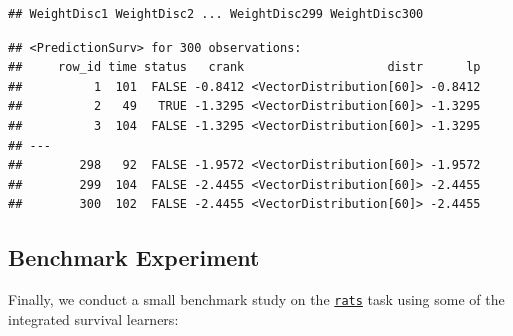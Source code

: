 \documentclass[]{scrbook}
\newenvironment{Shaded}{\begin{snugshade}}{\end{snugshade}}
\newcommand{\CommentTok}[1]{\textcolor[rgb]{0.56,0.35,0.01}{\textit{#1}}}
\newcommand{\DataTypeTok}[1]{\textcolor[rgb]{0.13,0.29,0.53}{#1}}
\newcommand{\DecValTok}[1]{\textcolor[rgb]{0.00,0.00,0.81}{#1}}
\newcommand{\KeywordTok}[1]{\textcolor[rgb]{0.13,0.29,0.53}{\textbf{#1}}}
\newcommand{\NormalTok}[1]{#1}
\newcommand{\OperatorTok}[1]{\textcolor[rgb]{0.81,0.36,0.00}{\textbf{#1}}}
\newcommand{\OtherTok}[1]{\textcolor[rgb]{0.56,0.35,0.01}{#1}}
\newcommand{\StringTok}[1]{\textcolor[rgb]{0.31,0.60,0.02}{#1}}
\renewenvironment{Shaded} {\begin{snugshade}\small} {\end{snugshade}}
\begin{document}
\begin{verbatim}
## WeightDisc1 WeightDisc2 ... WeightDisc299 WeightDisc300
\end{verbatim}

\begin{Shaded}
\end{Shaded}

\begin{verbatim}
## <PredictionSurv> for 300 observations:
##     row_id time status   crank                    distr      lp
##          1  101  FALSE -0.8412 <VectorDistribution[60]> -0.8412
##          2   49   TRUE -1.3295 <VectorDistribution[60]> -1.3295
##          3  104  FALSE -1.3295 <VectorDistribution[60]> -1.3295
## ---                                                            
##        298   92  FALSE -1.9572 <VectorDistribution[60]> -1.9572
##        299  104  FALSE -2.4455 <VectorDistribution[60]> -2.4455
##        300  102  FALSE -2.4455 <VectorDistribution[60]> -2.4455
\end{verbatim}

\hypertarget{benchmark-experiment}{%
\subsection{Benchmark Experiment}\label{benchmark-experiment}}

Finally, we conduct a small benchmark study on the \href{https://mlr3proba.mlr-org.com/reference/mlr_tasks_rats.html}{\texttt{rats}} task using some of the integrated survival learners:

\begin{Shaded}
\end{Shaded}
\end{document}
